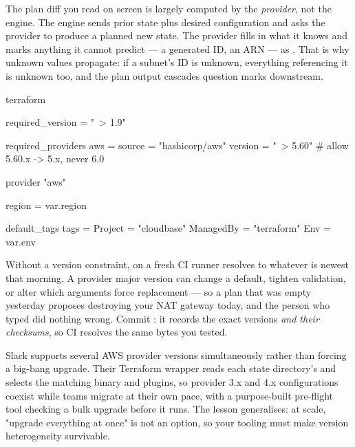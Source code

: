 \begin{behind}
The plan diff you read on screen is largely computed by the \emph{provider}, not the engine. The engine sends prior state plus desired configuration and asks the provider to produce a planned new state. The provider fills in what it knows and marks anything it cannot predict --- a generated ID, an ARN --- as . That is why unknown values propagate: if a subnet's ID is unknown, everything referencing it is unknown too, and the plan output cascades question marks downstream.
\end{behind}

\begin{tfbox}
terraform {
  required_version = "~> 1.9"

  required_providers {
    aws = {
      source  = "hashicorp/aws"
      version = "~> 5.60"   # allow 5.60.x -> 5.x, never 6.0
    }
  }
}

provider "aws" {
  region = var.region

  default_tags {
    tags = {
      Project   = "cloudbase"
      ManagedBy = "terraform"
      Env       = var.env
    }
  }
}
\end{tfbox}

\begin{secwarn}
Without a version constraint,  on a fresh CI runner resolves to whatever is newest that morning. A provider major version can change a default, tighten validation, or alter which arguments force replacement --- so a plan that was empty yesterday proposes destroying your NAT gateway today, and the person who typed  did nothing wrong. Commit : it records the exact versions \emph{and their checksums}, so CI resolves the same bytes you tested.
\end{secwarn}

\begin{seniornote}
Slack supports several AWS provider versions simultaneously rather than forcing a big-bang upgrade. Their Terraform wrapper reads each state directory's  and selects the matching binary and plugins, so provider 3.x and 4.x configurations coexist while teams migrate at their own pace, with a purpose-built pre-flight tool checking a bulk upgrade before it runs. The lesson generalises: at scale, "upgrade everything at once" is not an option, so your tooling must make version heterogeneity survivable.
\end{seniornote}

